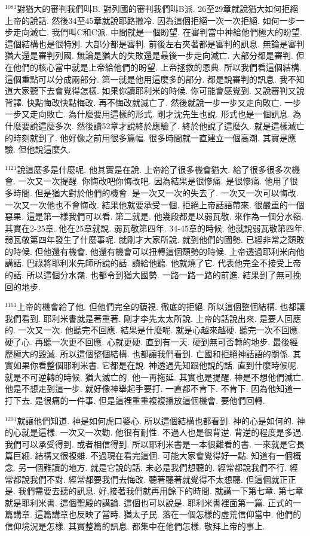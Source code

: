 \documentclass{book}
\begin{document}
$^{1081}$對猶大的審判我們叫B.
對列國的審判我們叫B派.
26至29章就說猶大如何拒絕上帝的說話.
然後34至45章就說耶路撒冷.
因為這個拒絕一次一次拒絕.
如何一步一步走向滅亡.
我們叫C和C派.
中間就是一個盼望.
在審判當中神給他們極大的盼望.
這個結構也是很特別.
大部分都是審判.
前後左右夾著都是審判的訊息.
無論是審判猶大還是審判列國.
無論是猶大的失敗還是最後一步走向滅亡.
大部分都是審判.
但在他們的核心當中就是上帝給他們的盼望.
上帝拯救的恩典.
所以我們看這個結構.
這個重點可以分成兩部分.
第一就是他用這麼多的部分.
都是說審判的訊息.
我不知道大家聽下去會覺得怎樣.
如果你讀耶利米的時候.
你可能會感覺到.
又說審判又說背譯.
快點悔改快點悔改.
再不悔改就滅亡了.
然後就說一步一步又走向敗亡.
一步一步又走向敗亡.
為什麼要用這樣的形式.
剛才沈先生也說.
形式也是一個訊息.
為什麼要說這麼多次.
然後讀52章才說終於應驗了.
終於他說了這麼久.
就是這樣滅亡的時刻就到了.
他好像之前用很多篇幅.
很多時間就一直建立一個高潮.
其實是應驗.
但他說這麼久.

$^{1121}$說這麼多是什麼呢.
他其實是在說.
上帝給了很多機會猶大.
給了很多很多次機會.
一次又一次提醒.
你悔改吧你悔改吧.
因為結果是很慘痛.
是很慘痛.
他用了很多時間.
但是猶大對於他們的機會.
是一次又一次的失去了.
一次又一次可以悔改.
一次又一次他也不會悔改.
結果他就要承受一個.
拒絕上帝話語帶來.
很嚴重的一個惡果.
這是第一樣我們可以看.
第二就是.
他幾段都是以弱瓦敬.
來作為一個分水嶺.
其實在2-25章.
他在25章就說.
弱瓦敬第四年.
34-45章的時候.
他就說弱瓦敬第四年.
弱瓦敬第四年發生了什麼事呢.
就剛才大家所說.
就到他們的國勢.
已經非常之頹敗的時候.
但他還有機會.
他還有機會可以扭轉這個頹勢的時候.
上帝透過耶利米向他講話.
巴祿將耶利米先師所說的話.
讀給他聽.
他就燒了它.
代表他完全不接受上帝的話.
所以這個分水嶺.
也都令到猶大國勢.
一路一路一路的前進.
結果到了無可挽回的地步.

$^{1161}$上帝的機會給了他.
但他們完全的藐視.
徹底的拒絕.
所以這個整個結構.
也都讓我們看到.
耶利米書就是著重著.
剛才李先太太所說.
上帝的話說出來.
是要人回應的.
一次又一次.
他聽完不回應.
結果是什麼呢.
就是心越來越硬.
聽完一次不回應.
硬了心.
再聽一次更不回應.
心就更硬.
直到有一天.
硬到無可否轉的地步.
最後經歷極大的毀滅.
所以這個整個結構.
也都讓我們看到.
亡國和拒絕神話語的關係.
其實如果你看整個耶利米書.
它都是在說.
神透過先知跟他說的話.
直到什麼時候呢.
就是不可逆轉的時候.
猶大滅亡的.
他一再拖延.
其實也是提醒.
神是不想他們滅亡.
他是不想走到這一步.
就好像神舉起手要打.
一直都不肯下.
不肯下.
因為他知道一打下去.
是很痛的一件事.
但是這裡重重複複播放這個機會.
要他們回轉.

$^{1201}$就讓他們知道.
神是如何虎口婆心.
所以這個結構也都看到.
神的心是如何的.
神的心就是這樣.
一次又一次勸.
他很有耐性.
不過人也是很背逆.
背逆的程度是多過.
我們可以承受得到.
或者相信得到.
所以耶利米書是一本很難看的書.
一來就是它長篇巨細.
結構又很複雜.
不過現在看完這個.
可能大家會覺得好一點.
知道有一個概念.
另一個難讀的地方.
就是它說的話.
未必是我們想聽的.
經常都說我們不行.
經常都說我們不對.
經常都要我們去悔改.
聽著聽著就覺得不太想聽.
但這個就正正是.
我們需要去聽的訊息.
好,接著我們就再用餘下的時間.
就講一下第七章.
第七章就是耶利米書.
這個聖殿的講論.
這個也可以說是.
耶利米書裡面第一篇.
正式的一篇講章.
這篇講章也反映了當時.
猶太子民.
落在一個怎樣的虛荒信仰當中.
他們的信仰境況是怎樣.
其實整篇的訊息.
都集中在他們怎樣.
敬拜上帝的事上.
\end{document}
